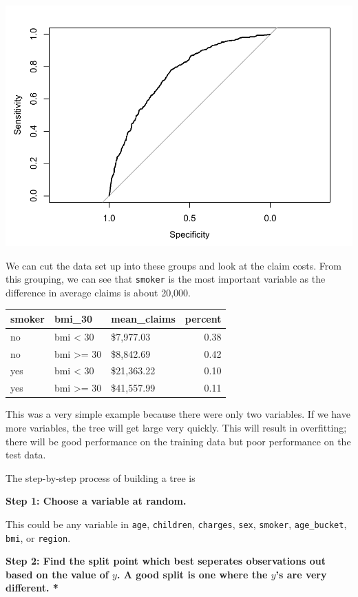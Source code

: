 \documentclass[]{book}
\begin{document}
\includegraphics{Exam-PA-Study-Manual_files/figure-latex/unnamed-chunk-116-1.pdf}

We can cut the data set up into these groups and look at the claim costs. From this grouping, we can see that \texttt{smoker} is the most important variable as the difference in average claims is about 20,000.

\begin{longtable}[]{@{}lllr@{}}
\toprule
smoker & bmi\_30 & mean\_claims & percent\tabularnewline
\midrule
\endhead
no & bmi \textless{} 30 & \$7,977.03 & 0.38\tabularnewline
no & bmi \textgreater= 30 & \$8,842.69 & 0.42\tabularnewline
yes & bmi \textless{} 30 & \$21,363.22 & 0.10\tabularnewline
yes & bmi \textgreater= 30 & \$41,557.99 & 0.11\tabularnewline
\bottomrule
\end{longtable}

This was a very simple example because there were only two variables. If we have more variables, the tree will get large very quickly. This will result in overfitting; there will be good performance on the training data but poor performance on the test data.

The step-by-step process of building a tree is

\textbf{Step 1: Choose a variable at random.}

This could be any variable in \texttt{age}, \texttt{children}, \texttt{charges}, \texttt{sex}, \texttt{smoker}, \texttt{age\_bucket}, \texttt{bmi}, or \texttt{region}.

\textbf{Step 2: Find the split point which best seperates observations out based on the value of \(y\). A good split is one where the \(y\)'s are very different. * }
\end{document}
